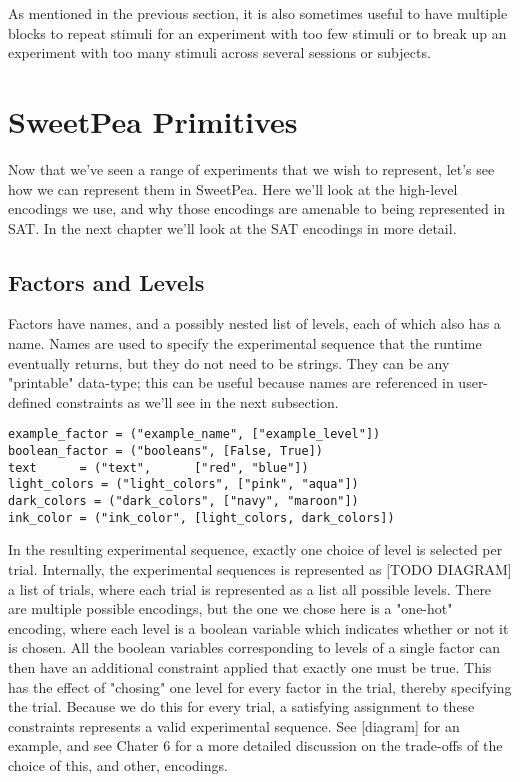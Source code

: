 As mentioned in the previous section, it is also sometimes useful to have multiple blocks to repeat stimuli for an experiment with too few stimuli or to break up an experiment with too many stimuli across several sessions or subjects.

\section{SweetPea Primitives}

Now that we've seen a range of experiments that we wish to represent, let's see how we can represent them in SweetPea. Here we'll look at the high-level encodings we use, and why those encodings are amenable to being represented in SAT. In the next chapter we'll look at the SAT encodings in more detail.

\subsection{Factors and Levels}
Factors have names, and a possibly nested list of levels, each of which also has a name. Names are used to specify the experimental sequence that the runtime eventually returns, but they do not need to be strings. They can be any "printable" data-type; this can be useful because names are referenced in user-defined constraints as we'll see in the next subsection.

\begin{lstlisting}
example_factor = ("example_name", ["example_level"])
boolean_factor = ("booleans", [False, True])
text      = ("text",      ["red", "blue"])
light_colors = ("light_colors", ["pink", "aqua"])
dark_colors = ("dark_colors", ["navy", "maroon"])
ink_color = ("ink_color", [light_colors, dark_colors])
\end{lstlisting}

In the resulting experimental sequence, exactly one choice of level is selected per trial. Internally, the experimental sequences is represented as [TODO DIAGRAM] a list of trials, where each trial is represented as a list all possible levels. There are multiple possible encodings, but the one we chose here is a "one-hot" encoding, where each level is a boolean variable which indicates whether or not it is chosen. All the boolean variables corresponding to levels of a single factor can then have an additional constraint applied that exactly one must be true. This has the effect of "chosing" one level for every factor in the trial, thereby specifying the trial. Because we do this for every trial, a satisfying assignment to these constraints represents a valid experimental sequence. See [diagram] for an example, and see Chater 6 for a more detailed discussion on the trade-offs of the choice of this, and other, encodings.

